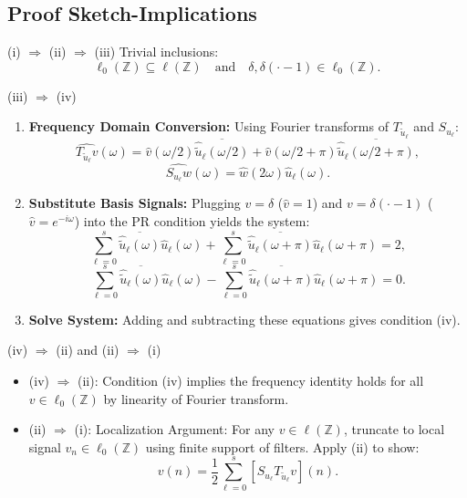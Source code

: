 \documentclass{beamer}
\begin{document}
\subsection*{Proof Sketch-Implications}

\begin{frame}{(i) $\Rightarrow$ (ii) $\Rightarrow$ (iii)}
    Trivial inclusions:
    \[
        \ell_0(\mathbb{Z})\subseteq \ell(\mathbb{Z})\quad\text{and}\quad \delta,\delta(\cdot-1)\in\ell_0(\mathbb{Z}).
    \]
\end{frame}

\begin{frame}{(iii) $\Rightarrow$ (iv)}
    \begin{enumerate}
        \item \textbf{Frequency Domain Conversion:} Using Fourier transforms of $T_{\tilde{u}_\ell}$ and $S_{u_\ell}$:
              \[
                  \widehat{T_{\tilde{u}_\ell} v}(\omega) = \hat{v}(\omega/2)\overline{\hat{\tilde{u}}_\ell(\omega/2)} + \hat{v}(\omega/2+\pi)\overline{\hat{\tilde{u}}_\ell(\omega/2+\pi)},
              \]
              \[
                  \widehat{S_{u_\ell} w}(\omega) = \hat{w}(2\omega)\hat{u}_\ell(\omega).
              \]

        \item \textbf{Substitute Basis Signals:} Plugging $v = \delta$ ($\hat{v}=1$) and $v = \delta(\cdot-1)$ ($\hat{v}=e^{-i\omega}$) into the PR condition yields the system:
              \[
                  \sum_{\ell=0}^s \overline{\hat{\tilde{u}}_\ell(\omega)}\hat{u}_\ell(\omega) + \sum_{\ell=0}^s \overline{\hat{\tilde{u}}_\ell(\omega+\pi)}\hat{u}_\ell(\omega+\pi) = 2,
              \]
              \[
                  \sum_{\ell=0}^s \overline{\hat{\tilde{u}}_\ell(\omega)}\hat{u}_\ell(\omega) - \sum_{\ell=0}^s \overline{\hat{\tilde{u}}_\ell(\omega+\pi)}\hat{u}_\ell(\omega+\pi) = 0.
              \]

        \item \textbf{Solve System:} Adding and subtracting these equations gives condition (iv).
    \end{enumerate}
\end{frame}

\begin{frame}{(iv) $\Rightarrow$ (ii) and (ii) $\Rightarrow$ (i)}
    \begin{itemize}
        \item (iv) $\Rightarrow$ (ii): Condition (iv) implies the frequency identity holds for all $v \in \ell_0(\mathbb{Z})$ by linearity of Fourier transform.
        \item (ii) $\Rightarrow$ (i):  {Localization Argument:} For any $v \in \ell(\mathbb{Z})$, truncate to local signal $v_n \in \ell_0(\mathbb{Z})$ using finite support of filters. Apply (ii) to show:
              \[
                  v(n) = \frac{1}{2}\sum_{\ell=0}^s [S_{u_\ell} T_{\tilde{u}_\ell} v](n).
              \]
    \end{itemize}
\end{frame}
\end{document}

